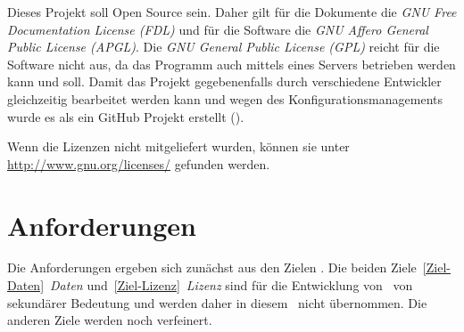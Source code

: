 Dieses Projekt soll Open Source sein.
Daher gilt für die Dokumente die \emph{GNU Free Documentation License (FDL)} und für die Software die \emph{GNU Affero General Public License (APGL)}.
Die \emph{GNU General Public License (GPL)} reicht für die Software nicht aus, da das Programm auch mittels eines Servers betrieben werden kann und soll.
Damit das Projekt gegebenenfalls durch verschiedene Entwickler gleichzeitig bearbeitet werden kann und wegen des Konfigurationsmanagements wurde es als ein GitHub Projekt erstellt ().

Wenn die Lizenzen nicht mitgeliefert wurden, können sie unter \url{http://www.gnu.org/licenses/} gefunden werden.

\section     {Anforderungen}%
\label   {sec-Anforderungen}

Die Anforderungen ergeben sich zunächst aus den Zielen .
Die beiden Ziele~\ref{Ziel-Daten}~\emph{Daten} und~\ref{Ziel-Lizenz}~\emph{Lizenz} sind für die Entwicklung von \ASBA\ von sekundärer Bedeutung und werden daher in diesem \sectionname\ nicht übernommen.
Die anderen Ziele werden noch verfeinert.

